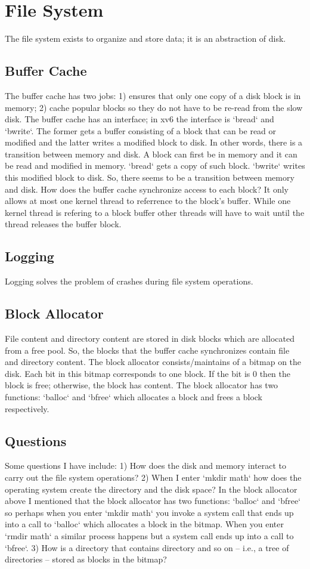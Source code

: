 \documentclass{amsbook}
\begin{document}
\section{File System}
The file system exists to organize and store data; it is an abstraction of disk.

\subsection{Buffer Cache}
The buffer cache has two jobs: 1) ensures that only one copy of a disk block is in memory; 2) cache popular blocks so they do not have to be re-read from the slow disk. The buffer cache has an interface; in xv6 the interface is `bread` and `bwrite`. The former gets a buffer consisting of a block that can be read or modified and the latter writes a modified block to disk. In other words, there is a transition between memory and disk. A block can first be in memory and it can be read and modified in memory. `bread` gets a copy of such block. `bwrite` writes this modified block to disk. So, there seems to be a transition between memory and disk. How does the buffer cache synchronize access to each block? It only allows at most one kernel thread to referrence to the block's buffer. While one kernel thread is refering to a block buffer other threads will have to wait until the thread releases the buffer block.

\subsection{Logging}
Logging solves the problem of crashes during file system operations.

\subsection{Block Allocator}
File content and directory content are stored in disk blocks which are allocated from a free pool. So, the blocks that the buffer cache synchronizes contain file and directory content. The block allocator consists/maintains of a bitmap on the disk. Each bit in this bitmap corresponds to one block. If the bit is 0 then the block is free; otherwise, the block has content. The block allocator has two functions: `balloc` and `bfree` which allocates a block and frees a block respectively.

\subsection{Questions}
Some questions I have include: 1) How does the disk and memory interact to carry out the file system operations? 2) When I enter `mkdir math` how does the operating system create the directory and the disk space? In the block allocator above I mentioned that the block allocator has two functions: `balloc` and `bfree` so perhaps when you enter `mkdir math` you invoke a system call that ends up into a call to `balloc` which allocates a block in the bitmap. When you enter `rmdir math` a similar process happens but a system call ends up into a call to `bfree`. 3) How is a directory that contains directory and so on -- i.e., a tree of directories -- stored as blocks in the bitmap?
\end{document}
